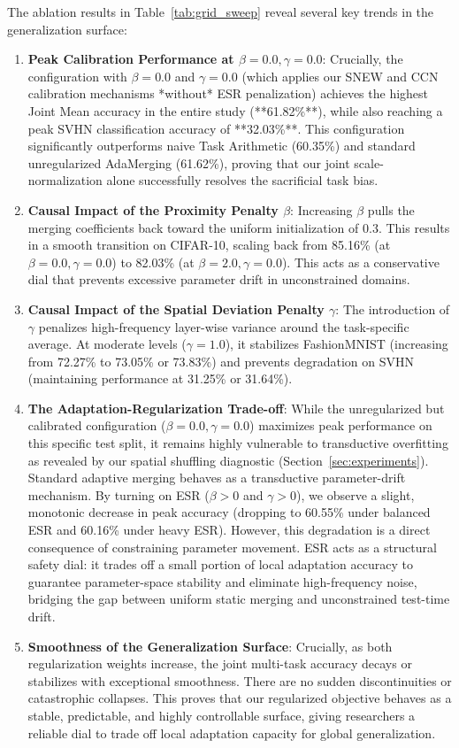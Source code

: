 The ablation results in Table~\ref{tab:grid_sweep} reveal several key trends in the generalization surface:
\begin{enumerate}
    \item \textbf{Peak Calibration Performance at $\beta = 0.0, \gamma = 0.0$}: Crucially, the configuration with $\beta = 0.0$ and $\gamma = 0.0$ (which applies our SNEW and CCN calibration mechanisms *without* ESR penalization) achieves the highest Joint Mean accuracy in the entire study (**61.82\%**), while also reaching a peak SVHN classification accuracy of **32.03\%**. This configuration significantly outperforms naive Task Arithmetic (60.35\%) and standard unregularized AdaMerging (61.62\%), proving that our joint scale-normalization alone successfully resolves the sacrificial task bias.
    \item \textbf{Causal Impact of the Proximity Penalty $\beta$}: Increasing $\beta$ pulls the merging coefficients back toward the uniform initialization of $0.3$. This results in a smooth transition on CIFAR-10, scaling back from 85.16\% (at $\beta = 0.0, \gamma = 0.0$) to 82.03\% (at $\beta = 2.0, \gamma = 0.0$). This acts as a conservative dial that prevents excessive parameter drift in unconstrained domains.
    \item \textbf{Causal Impact of the Spatial Deviation Penalty $\gamma$}: The introduction of $\gamma$ penalizes high-frequency layer-wise variance around the task-specific average. At moderate levels ($\gamma = 1.0$), it stabilizes FashionMNIST (increasing from 72.27\% to 73.05\% or 73.83\%) and prevents degradation on SVHN (maintaining performance at 31.25\% or 31.64\%).
    \item \textbf{The Adaptation-Regularization Trade-off}: While the unregularized but calibrated configuration ($\beta = 0.0, \gamma = 0.0$) maximizes peak performance on this specific test split, it remains highly vulnerable to transductive overfitting as revealed by our spatial shuffling diagnostic (Section~\ref{sec:experiments}). Standard adaptive merging behaves as a transductive parameter-drift mechanism. By turning on ESR ($\beta > 0$ and $\gamma > 0$), we observe a slight, monotonic decrease in peak accuracy (dropping to 60.55\% under balanced ESR and 60.16\% under heavy ESR). However, this degradation is a direct consequence of constraining parameter movement. ESR acts as a structural safety dial: it trades off a small portion of local adaptation accuracy to guarantee parameter-space stability and eliminate high-frequency noise, bridging the gap between uniform static merging and unconstrained test-time drift.
    \item \textbf{Smoothness of the Generalization Surface}: Crucially, as both regularization weights increase, the joint multi-task accuracy decays or stabilizes with exceptional smoothness. There are no sudden discontinuities or catastrophic collapses. This proves that our regularized objective behaves as a stable, predictable, and highly controllable surface, giving researchers a reliable dial to trade off local adaptation capacity for global generalization.
\end{enumerate}


